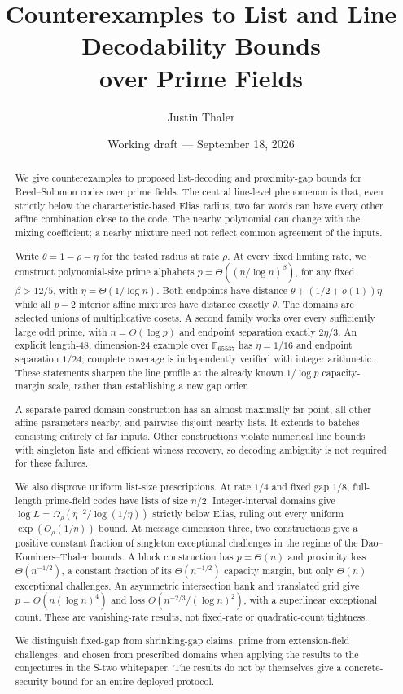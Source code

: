 \documentclass[11pt,letterpaper]{article}
\title{Counterexamples to List and Line Decodability Bounds\\over Prime Fields}
\author{Justin Thaler}
\date{Working draft --- September 18, 2026}
\theoremstyle{definition}
\theoremstyle{remark}
\begin{document}
\maketitle
\begin{abstract}
We give counterexamples to proposed list-decoding and proximity-gap
bounds for Reed--Solomon codes over prime fields. The central line-level
phenomenon is that, even strictly below the characteristic-based Elias
radius, two far words can have every other affine combination close to
the code. The nearby polynomial can change with the mixing coefficient;
a nearby mixture need not reflect common agreement of the inputs.

Write $\theta=1-\rho-\eta$ for the tested radius at rate $\rho$.
At every fixed limiting rate, we construct polynomial-size prime
alphabets $p=\Theta((n/\log n)^\beta)$, for any fixed $\beta>12/5$,
with $\eta=\Theta(1/\log n)$. Both endpoints have distance
$\theta+(1/2+o(1))\eta$, while all $p-2$ interior affine mixtures
have distance exactly $\theta$. The domains are selected unions of
multiplicative cosets. A second family works over every sufficiently
large odd prime, with $n=\Theta(\log p)$ and endpoint separation
exactly $2\eta/3$. An explicit length-48, dimension-24 example over
$\mathbb F_{65537}$ has $\eta=1/16$ and endpoint separation $1/24$;
complete coverage is independently verified with integer arithmetic.
These statements sharpen the line profile at the already known
$1/\log p$ capacity-margin scale, rather than establishing a new gap order.

A separate paired-domain construction has an almost maximally far
point, all other affine parameters nearby, and pairwise disjoint
nearby lists. It extends to batches consisting entirely of far inputs.
Other constructions violate numerical line bounds with singleton
lists and efficient witness recovery, so decoding ambiguity is not
required for these failures.

We also disprove uniform list-size prescriptions. At rate $1/4$ and
fixed gap $1/8$, full-length prime-field codes have lists of size $n/2$.
Integer-interval domains give
$\log L=\Omega_\rho(\eta^{-2}/\log(1/\eta))$ strictly below Elias,
ruling out every uniform $\exp(O_\rho(1/\eta))$ bound.
At message dimension three, two constructions give a positive constant
fraction of singleton exceptional challenges in the regime of the
Dao--Kominers--Thaler bounds. A block construction has $p=\Theta(n)$
and proximity loss $\Theta(n^{-1/2})$, a constant fraction of its
$\Theta(n^{-1/2})$ capacity margin, but only $\Theta(n)$ exceptional
challenges. An asymmetric intersection bank and translated grid give
$p=\Theta(n(\log n)^4)$ and loss
$\Theta(n^{-2/3}/(\log n)^2)$, with a superlinear exceptional count.
These are vanishing-rate results, not fixed-rate or quadratic-count
tightness.

We distinguish fixed-gap from shrinking-gap claims, prime from
extension-field challenges, and chosen from prescribed domains when
applying the results to the conjectures in the S-two whitepaper.
The results do not by themselves give a concrete-security bound for
an entire deployed protocol.
\end{abstract}
\end{document}
